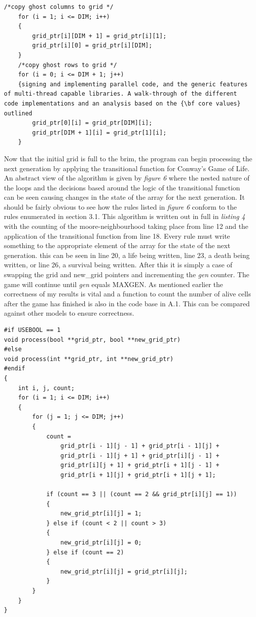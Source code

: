 \documentclass[11pt]{article} %
\begin{document}
\begin{lstlisting}[caption = {Copying ghost cells}]
    /*copy ghost columns to grid */
    for (i = 1; i <= DIM; i++)
    {
        grid_ptr[i][DIM + 1] = grid_ptr[i][1];
        grid_ptr[i][0] = grid_ptr[i][DIM];
    }
    /*copy ghost rows to grid */
    for (i = 0; i <= DIM + 1; j++)
    {signing and implementing parallel code, and the generic features of multi-thread capable libraries. A walk-through of the different code implementations and an analysis based on the {\bf core values} outlined 
        grid_ptr[0][i] = grid_ptr[DIM][i];
        grid_ptr[DIM + 1][i] = grid_ptr[1][i];
    }
\end{lstlisting}
Now that the initial grid is full to the brim, the program can begin processing the next generation by applying the transitional function for Conway's Game of Life. An abstract view of the algorithm is given by {\it figure 6} where the nested nature of the loops and the decisions based around the logic of the transitional function can be seen causing changes in the state of the array for the next generation. It should be fairly obvious to see how the rules listed in {\it figure 6} conform to the rules enumerated in section 3.1. This algorithm is written out in full in {\it listing 4} with the counting of the moore-neighbourhood taking place from line 12 and the application of the transitional function from line 18. Every rule must write something to the appropriate element of the array for the state of the next generation. this can be seen in line 20, a life being written, line 23, a death being written, or line 26, a survival being written. After this it is simply a case of swapping the grid and new\_grid pointers and incrementing the {\it gen} counter. The game will continue until {\it gen} equals MAXGEN. As mentioned earlier the correctness of my results is vital and a function to count the number of alive cells after the game has finished is also in the code base in A.1. This can be compared against other models to ensure correctness. 
\bigskip\bigskip\bigskip
\begin{lstlisting}[caption={Processing the Moore-neighbourhood and writing to the next generations global state array}]
#if USEBOOL == 1
void process(bool **grid_ptr, bool **new_grid_ptr)
#else
void process(int **grid_ptr, int **new_grid_ptr)
#endif
{
	int i, j, count;
	for (i = 1; i <= DIM; i++)
	{
		for (j = 1; j <= DIM; j++)
		{
			count =
			    grid_ptr[i - 1][j - 1] + grid_ptr[i - 1][j] +
			    grid_ptr[i - 1][j + 1] + grid_ptr[i][j - 1] +
			    grid_ptr[i][j + 1] + grid_ptr[i + 1][j - 1] +
			    grid_ptr[i + 1][j] + grid_ptr[i + 1][j + 1];

			if (count == 3 || (count == 2 && grid_ptr[i][j] == 1))
			{
				new_grid_ptr[i][j] = 1;
			} else if (count < 2 || count > 3)
			{
				new_grid_ptr[i][j] = 0;
			} else if (count == 2)
			{
				new_grid_ptr[i][j] = grid_ptr[i][j];
			}
		}
	}
}
\end{lstlisting}
\end{document}
